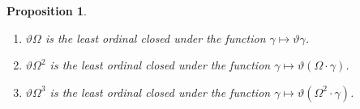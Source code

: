 \documentclass[UKenglish,cleveref,DIV=12]{scrartcl}
\newtheorem{proposition}[lemma]{Proposition}
\theoremstyle{definition}
\theoremstyle{definition}
\begin{document}
\begin{proposition}\label{extprop:thetaitems2}\
\begin{enumerate}
 \item $\vartheta\Omega$ is the least ordinal closed under the function $\gamma\mapsto\vartheta\gamma$.
 \item $\vartheta\Omega^2$ is the least ordinal closed under the function $\gamma\mapsto\vartheta(\Omega\cdot\gamma)$.
 \item $\vartheta\Omega^3$ is the least ordinal closed under the function $\gamma\mapsto\vartheta(\Omega^2\cdot\gamma)$.
\end{enumerate}
\end{proposition}
\end{document}
